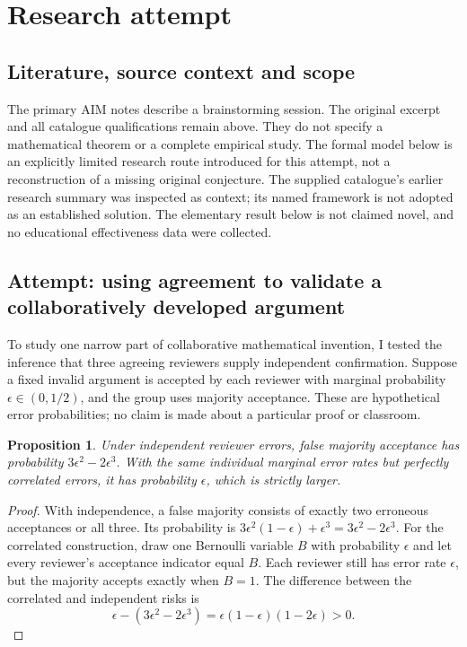 \documentclass[11pt]{article}
\newtheorem{proposition}{Proposition}
\begin{document}
\section{Research attempt}
\subsection{Literature, source context and scope}
The primary AIM notes describe a brainstorming session. The original excerpt and all catalogue qualifications remain above. They do not specify a mathematical theorem or a complete empirical study. The formal model below is an explicitly limited research route introduced for this attempt, not a reconstruction of a missing original conjecture. The supplied catalogue's earlier research summary was inspected as context; its named framework is not adopted as an established solution. The elementary result below is not claimed novel, and no educational effectiveness data were collected.

\subsection{Attempt: using agreement to validate a collaboratively developed argument}
To study one narrow part of collaborative mathematical invention, I tested the inference that three agreeing reviewers supply independent confirmation. Suppose a fixed invalid argument is accepted by each reviewer with marginal probability $\epsilon\in(0,1/2)$, and the group uses majority acceptance. These are hypothetical error probabilities; no claim is made about a particular proof or classroom.
\begin{proposition}
Under independent reviewer errors, false majority acceptance has probability $3\epsilon^2-2\epsilon^3$. With the same individual marginal error rates but perfectly correlated errors, it has probability $\epsilon$, which is strictly larger.
\end{proposition}
\begin{proof}
With independence, a false majority consists of exactly two erroneous acceptances or all three. Its probability is $3\epsilon^2(1-\epsilon)+\epsilon^3=3\epsilon^2-2\epsilon^3$. For the correlated construction, draw one Bernoulli variable $B$ with probability $\epsilon$ and let every reviewer's acceptance indicator equal $B$. Each reviewer still has error rate $\epsilon$, but the majority accepts exactly when $B=1$. The difference between the correlated and independent risks is
\[
\epsilon-(3\epsilon^2-2\epsilon^3)=\epsilon(1-\epsilon)(1-2\epsilon)>0.
\]
\end{proof}
\end{document}
